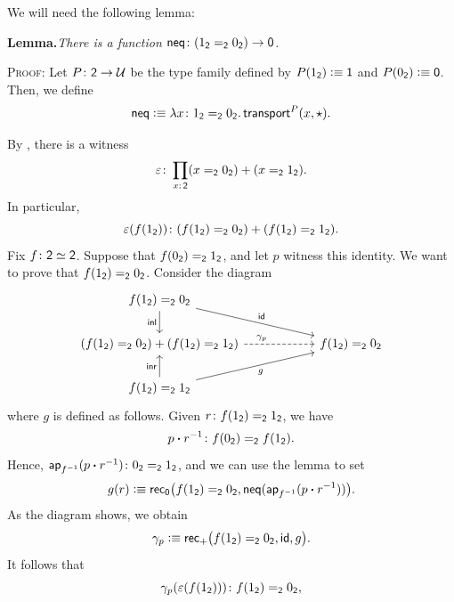 \begin{solution}
    We will need the following lemma:

    \textbf{Lemma.}\quad\textit{There is a function $\fun{neq}\colon(1_{\fun2}\eq{\fun2}0_{\fun2})\to\fun0$.}

    \textsc{Proof:}
        Let $P\colon\fun2\to\univ$ be the type family defined by $P(1_{\mathsf{2}})\mathrel{\vcentcolon}\equiv\mathsf{1}$ and $P(0_{\mathsf{2}})\mathrel{\vcentcolon}\equiv\mathsf{0}$. Then, we define
        \[
            \fun{neq}\defeq\lambda x\colon1_{\fun2}\eq{\fun2}0_{\fun2}.\,
                \fun{transport}^P(x,\fun\star).
        \]
        \localqed
    
    By , there is a witness
    \[
        \varepsilon\colon\prod_{x\colon\fun2}
            (x\eq{\fun2}0_{\fun2})+(x\eq{\fun2}1_{\fun2}).
    \]
    In particular,
    \[
        \varepsilon(f(1_{\fun2}))\colon
            (f(1_{\fun2})\eq{\fun2}0_{\fun2})
            +(f(1_{\fun2})\eq{\fun2}1_{\fun2}).
    \]
    Fix $f\colon\fun2\simeq\fun2$. Suppose that $f(0_{\mathsf{2}})\mathrel{=_{\mathsf{2}}}1_{\mathsf{2}}$, and let $p$ witness this identity. We want to prove that $f(1_{\mathsf{2}})\mathrel{=_{\mathsf{2}}}0_{\mathsf{2}}$. Consider the diagram
    \[
        \begin{tikzcd}[column sep=2cm]
            f(1_{\fun2})\eq{\fun2}0_{\fun2}
                    \arrow[rd,"\id"]
                    \arrow[d,"\fun{inl}"']\\
            (f(1_{\fun2})\eq{\fun2}0_{\fun2})+(f(1_{\fun2})\eq{\fun2}1_{\fun2})
                    \arrow[r,"\gamma_p",near start,dashed]
                &f(1_{\fun2})\eq{\fun2}0_{\fun2}\\
            f(1_{\fun2})\eq{\fun2}1_{\fun2}
                    \arrow[ru,"g"']
                    \arrow[u,"\fun{inr}"]
        \end{tikzcd}
    \]
    where $g$ is defined as follows. Given $r\colon f(1_{\fun2})\eq{\fun2}1_{\fun2}$, we have
    \[
        p\ct r^{-1}\colon f(0_{\fun2})\eq{\fun2}f(1_{\fun2}).
    \]
    Hence, $\fun{ap}_{f^{-1}}(p\ct r^{-1})\colon0_{\fun2}\eq{\fun2}1_{\fun2}$, and we can use the lemma to set
    \[
        g(r)\mathrel{\vcentcolon}\equiv\mathsf{rec}_{\mathsf{0}}
            \bigl(
                f(1_{\mathsf{2}})\mathrel{=_{\mathsf{2}}}0_{\mathsf{2}},
                \mathsf{neq}(\mathsf{ap}_{f^{-1}}(p\mathbin{\boldsymbol{\cdot}} r^{-1}))
            \bigr).
    \]
    As the diagram shows, we obtain
    \[
        \gamma_p\mathrel{\vcentcolon}\equiv
        \mathsf{rec}_+\bigl(f(1_{\mathsf{2}})\mathrel{=_{\mathsf{2}}}0_{\mathsf{2}},\mathsf{id},g\bigr).
    \]
    It follows that
    \[
        \gamma_p(\varepsilon(f(1_{\fun2})))
            \colon f(1_{\fun2})\eq{\fun2}0_{\fun2},
\]
\end{solution}
